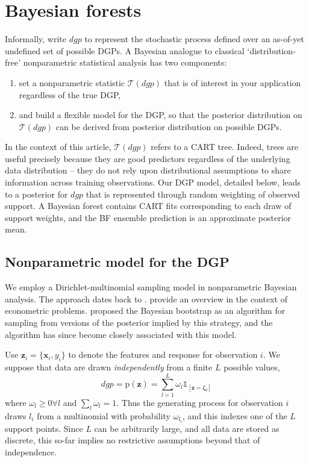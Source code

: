 \documentclass{article}
\begin{document}
\section{Bayesian forests}\label{bayesian-forests}

Informally, write $dgp$ to represent the stochastic process defined over an as-of-yet undefined set of possible DGPs.
A Bayesian analogue to classical `distribution-free' nonparametric
statistical analysis \citep[e.g.,][]{hollander_nonparametric_1999} has two components:
\begin{enumerate}
\item set a nonparametric statistic $\mathcal{T}(dgp)$ that is of interest in your application regardless of the true DGP,
\item and build a flexible model for the DGP, so that the posterior distribution on $\mathcal{T}(dgp)$ can be derived from  posterior distribution on possible DGPs.
\end{enumerate}
In  the context of this article, $\mathcal{T}(dgp)$ refers to a CART tree.   Indeed, trees are useful precisely because they are good predictors regardless of the underlying data distribution -- they do not rely upon distributional assumptions to share information across training observations. 
Our DGP model, detailed below, leads to a posterior for $dgp$ that is represented through random weighting of observed support.  A Bayesian forest contains CART fits corresponding to each draw of support weights, and the BF ensemble prediction is an approximate posterior mean.

\subsection{Nonparametric model for the DGP}\label{dgpmodel}

We employ a Dirichlet-multinomial sampling model in nonparametric
Bayesian analysis. The approach dates back to
\citet{ferguson_bayesian_1973}. \citet{chamberlain_nonparametric_2003}
provide an overview in the context of econometric problems.
\citet{rubin_bayesian_1981} proposed the Bayesian bootstrap as an
algorithm for sampling from versions of the posterior implied by this
strategy, and the algorithm has since become closely associated with
this model.

Use $\mathbf{z}_i = \{\mathbf{x}_i,y_i\}$ to denote the  features
and response  for observation $i$. We suppose that data are drawn
\emph{independently} from a finite  $L$  possible values,
\begin{equation}\label{dgpeq}
dgp = \mathrm{p}(\mathbf{z}) = \sum_{l=1}^L \omega_l \mathds{1}_{[\mathbf{z} = \boldsymbol{\zeta}_l]}
\end{equation}
where $\omega_l\geq0\forall l$ and $\sum_l \omega_l = 1$. Thus the
generating process for observation $i$ draws $l_i$ from a multinomial
with probability $\omega_{l_i}$, and this indexes one of the $L$ support
points. Since $L$ can be arbitrarily large, and all data are stored as
discrete, this so-far implies no restrictive
assumptions beyond that of independence.
\end{document}
